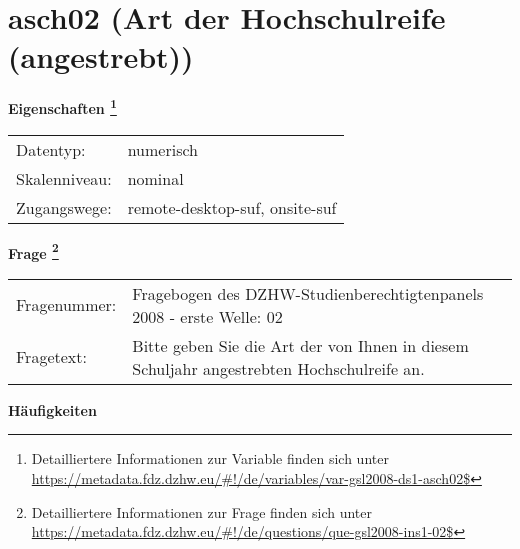 
    \setcounter{footnote}{0}

    \vspace*{-1.8cm}
	\section{asch02 (Art der Hochschulreife (angestrebt))}
	\label{section:asch02}



    \vspace*{0.5cm}
    \noindent\textbf{Eigenschaften
	\footnote{Detailliertere Informationen zur Variable finden sich unter
		\url{https://metadata.fdz.dzhw.eu/\#!/de/variables/var-gsl2008-ds1-asch02$}}}\\
	\begin{tabularx}{\hsize}{@{}lX}
	Datentyp: & numerisch \\
	Skalenniveau: & nominal \\
	Zugangswege: &
	  remote-desktop-suf, 
	  onsite-suf
 \\
    \end{tabularx}



				\vspace*{0.5cm}
                \noindent\textbf{Frage
	                \footnote{Detailliertere Informationen zur Frage finden sich unter
		              \url{https://metadata.fdz.dzhw.eu/\#!/de/questions/que-gsl2008-ins1-02$}}}\\
				\begin{tabularx}{\hsize}{@{}lX}
					Fragenummer: &
					  Fragebogen des DZHW-Studienberechtigtenpanels 2008 - erste Welle:
					  02
 \\
					Fragetext: & Bitte geben Sie die Art der von Ihnen in diesem Schuljahr angestrebten Hochschulreife an. \\
				\end{tabularx}





        		\vspace*{0.5cm}
                \noindent\textbf{Häufigkeiten}

